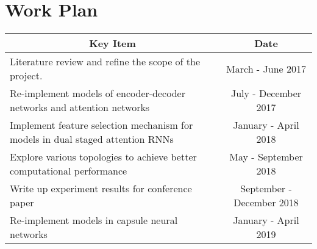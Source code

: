 \documentclass{article} \usepackage{tabularx}
\begin{document}
\section{Work Plan}

	\begin{table}[H]
		\centering
		\label{tab:work_plan}
		\def\arraystretch{1.5}%
		\begin{tabularx}{\textwidth}{|X|l|}
			\hline
			\multicolumn{1}{|c|}{\textbf{Key Item}}                                                        & \multicolumn{1}{c|}{\textbf{Date}} \\ \hline
			Literature review and refine the scope of the project.
                                                                                                     &
                                                                                                       \multicolumn{1}{c|}{March
                                                                                                       -
                                                                                                       June
                                                                                                       2017}
      \\ \hline
			Re-implement models of encoder-decoder networks and
      attention networks &
                                                                                        \multicolumn{1}{c|}{July
                                                                                        -
                                                                                        December
                                                                                        2017}            \\ \hline
			Implement feature selection mechanism for models in
      dual staged attention RNNs & \multicolumn{1}{c|}{January
                                      - April 2018}          \\ \hline
			Explore various topologies to achieve better computational
      performance & \multicolumn{1}{c|}{May - September 2018}             \\ \hline
			Write up experiment results for conference paper & \multicolumn{1}{c|}{September - December 2018}       \\ \hline
			Re-implement models in capsule neural networks&
                                                        \multicolumn{1}{c|}{January
                                                        - April 2019}            \\ \hline

\end{tabularx}
\end{table}
\end{document}
